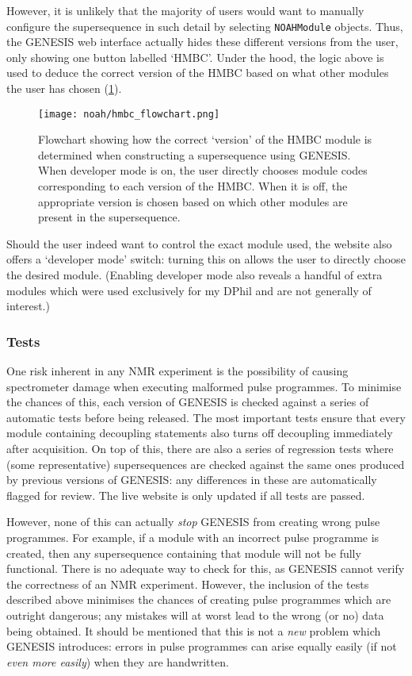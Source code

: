 However, it is unlikely that the majority of users would want to manually configure the supersequence in such detail by selecting \texttt{NOAHModule} objects.
Thus, the GENESIS web interface actually hides these different versions from the user, only showing one button labelled `HMBC'.
Under the hood, the logic above is used to deduce the correct version of the HMBC based on what other modules the user has chosen (\cref{fig:hmbc_flowchart}).

\begin{figure}[htb]
    \centering
    \texttt{[image: noah/hmbc\_flowchart.png]}%
    \caption[Flowchart for choosing HMBC module version]{
        Flowchart showing how the correct `version' of the HMBC module is determined when constructing a supersequence using GENESIS.
        When developer mode is on, the user directly chooses module codes corresponding to each version of the HMBC.
        When it is off, the appropriate version is chosen based on which other modules are present in the supersequence.
    }
    \label{fig:hmbc_flowchart}
\end{figure}

Should the user indeed want to control the exact module used, the website also offers a `developer mode' switch: turning this on allows the user to directly choose the desired module.
(Enabling developer mode also reveals a handful of extra modules which were used exclusively for my DPhil and are not generally of interest.)


\subsubsection{Tests}

One risk inherent in any NMR experiment is the possibility of causing spectrometer damage when executing malformed pulse programmes.
To minimise the chances of this, each version of GENESIS is checked against a series of automatic tests before being released.
The most important tests ensure that every module containing decoupling statements also turns off decoupling immediately after acquisition.
On top of this, there are also a series of regression tests where (some representative) supersequences are checked against the same ones produced by previous versions of GENESIS: any differences in these are automatically flagged for review.
The live website is only updated if all tests are passed.

However, none of this can actually \textit{stop} GENESIS from creating wrong pulse programmes.
For example, if a module with an incorrect pulse programme is created, then any supersequence containing that module will not be fully functional.
There is no adequate way to check for this, as GENESIS cannot verify the correctness of an NMR experiment.
However, the inclusion of the tests described above minimises the chances of creating pulse programmes which are outright dangerous; any mistakes will at worst lead to the wrong (or no) data being obtained.
It should be mentioned that this is not a \textit{new} problem which GENESIS introduces: errors in pulse programmes can arise equally easily (if not \textit{even more easily}) when they are handwritten.


